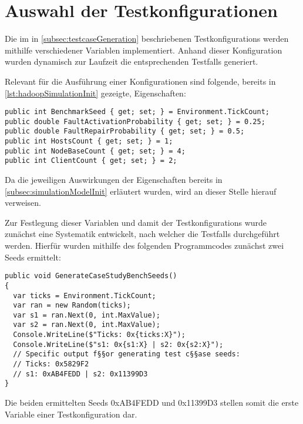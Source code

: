 \section{Auswahl der Testkonfigurationen}
\label{sec:selectTestcases}

Die im in \cref{subsec:testcaseGeneration} beschriebenen \glspl{Testkonfiguration} werden mithilfe verschiedener Variablen implementiert.
Anhand dieser Konfiguration wurden dynamisch zur Laufzeit die entsprechenden \glspl{Testfall} generiert.

Relevant für die Ausführung einer Konfigurationen sind folgende, bereits in \cref{lst:hadoopSimulationInit} gezeigte, Eigenschaften:

\begin{lstlisting}[label=lst:hadoopTest,style=cs,
caption={Zur Definition einer \gls{Testkonfiguration} relevante Felder}]
public int BenchmarkSeed { get; set; } = Environment.TickCount;
public double FaultActivationProbability { get; set; } = 0.25;
public double FaultRepairProbability { get; set; } = 0.5;
public int HostsCount { get; set; } = 1;
public int NodeBaseCount { get; set; } = 4;
public int ClientCount { get; set; } = 2;
\end{lstlisting}

Da die jeweiligen Auswirkungen der Eigenschaften bereits in \cref{subsec:simulationModelInit} erläutert wurden, wird an dieser Stelle hierauf verweisen.

Zur Festlegung dieser Variablen und damit der \glspl{Testkonfiguration} wurde zunächst eine Systematik entwickelt, nach welcher die \glspl{Testfall} durchgeführt werden.
Hierfür wurden mithilfe des folgenden Programmcodes zunächst zwei Seeds ermittelt:

\begin{lstlisting}[label=lst:generateTestCaseSeeds,style=cs,
caption={Ermittlung der für die \glspl{Testkonfiguration} genutzten Basisseeds}]
public void GenerateCaseStudyBenchSeeds()
{
  var ticks = Environment.TickCount;
  var ran = new Random(ticks);
  var s1 = ran.Next(0, int.MaxValue);
  var s2 = ran.Next(0, int.MaxValue);
  Console.WriteLine($"Ticks: 0x{ticks:X}");
  Console.WriteLine($"s1: 0x{s1:X} | s2: 0x{s2:X}");
  // Specific output f§§or generating test c§§ase seeds:
  // Ticks: 0x5829F2
  // s1: 0xAB4FEDD | s2: 0x11399D3
}
\end{lstlisting}

Die beiden ermittelten Seeds 0xAB4FEDD und 0x11399D3 stellen somit die erste Variable einer Testkonfiguration dar.

